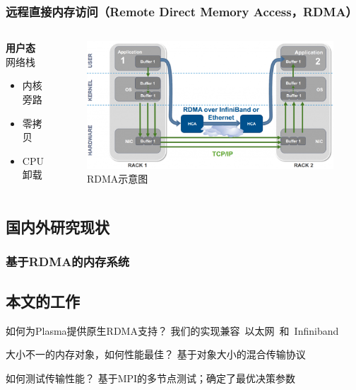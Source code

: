 \begin{frame}
	\frametitle{远程直接内存访问（Remote Direct Memory Access，RDMA）}
	\begin{columns}[onlytextwidth]
		\begin{block}{\textbf{用户态}网络栈}
			\begin{itemize}
				\item 内核旁路
				\item 零拷贝
				\item CPU卸载
			\end{itemize}
		\end{block}
		\vspace{1.5em}
		\begin{figure}
			\centering
			\includegraphics[width=\textwidth]{image/presentation/rdma.png}
			\caption{RDMA示意图}
			\label{fig:rdma}
		\end{figure}
	\end{columns}
\end{frame}

\subsection*{国内外研究现状}
\begin{frame}
	\frametitle{基于RDMA的内存系统}

	

\end{frame}

\subsection*{本文的工作}
\begin{frame}
	\begin{block}{如何为Plasma提供原生RDMA支持？}
		我们的实现兼容~以太网~和~Infiniband
	\end{block}
	\begin{block}{大小不一的内存对象，如何性能最佳？}
		基于对象大小的混合传输协议
	\end{block}
	\begin{block}{如何测试传输性能？}
		基于MPI的多节点测试；确定了最优决策参数
	\end{block}
\end{frame}
